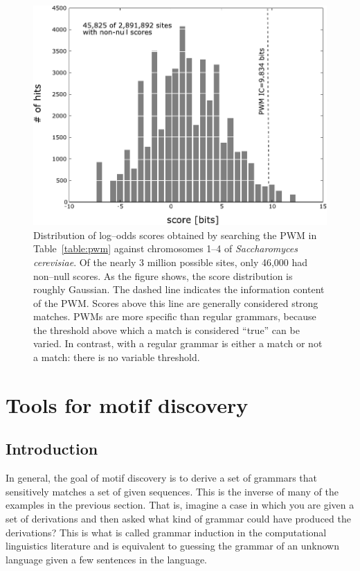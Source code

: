             \begin{figure}[ptb]
            \centering
            \includegraphics[width=\textwidth]{Body/Images-chap1/pwmHits.pdf}
            \caption[pwmHits]{Distribution of log--odds scores obtained by searching
            the PWM in Table~\vref{table:pwm} against chromosomes 1--4 of
            \emph{Saccharomyces cerevisiae}.  Of the nearly 3
            million possible sites, only 46,000 had non--null
            scores.  As the figure shows, the score distribution is
            roughly Gaussian.  The dashed line indicates the
            information content of the PWM\@.  Scores above this
            line are generally considered  strong matches.
            PWMs are more specific than regular grammars, because
            the threshold above which a match is considered ``true''
            can be varied.  In contrast, with a regular grammar is
            either a match or not a match: there is no variable threshold.
        }
            \label{fig:pwmHits}
            \end{figure}



\section{Tools for motif discovery}\label{section:tools}
\subsection*{Introduction}

    In general, the goal of motif discovery is to derive a set of
    grammars that sensitively matches a set of given sequences.
    This is the inverse of many of the examples in the previous
    section.  That is, imagine a case in which you are given a set
    of derivations and then asked what kind of grammar could have
    produced the derivations?  This is what is called grammar
    induction in  the computational linguistics literature and is
    equivalent to guessing the grammar of an unknown language given a few
    sentences in the language.

